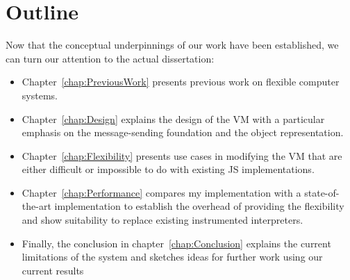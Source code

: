 \section{Outline}

Now that the conceptual underpinnings of our work have been established, we can
turn our attention to the actual dissertation: 
\begin{itemize}
    \item Chapter~\ref{chap:PreviousWork} presents previous work on flexible computer systems.
    \item Chapter~\ref{chap:Design} explains the design of the VM with a
        particular emphasis on the message-sending foundation and the object
        representation.
    \item Chapter~\ref{chap:Flexibility} presents use cases in modifying the VM
        that are either difficult or impossible to do with existing JS
        implementations.
    \item Chapter~\ref{chap:Performance} compares my implementation with a
        state-of-the-art implementation to establish the overhead of providing
        the flexibility and show suitability to replace existing instrumented
        interpreters.
    \item Finally, the conclusion in chapter~\ref{chap:Conclusion} explains the
        current limitations of the system and sketches ideas for further work
        using our current results
\end{itemize}
